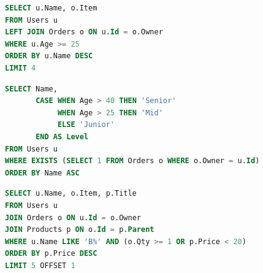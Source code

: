 \documentclass[a4paper,12pt]{article}
\begin{document}
\begin{lstlisting}[language=SQL, caption={Q3, kéttáblás LEFT JOIN szűréssel, rendezéssel és lapozással}, label={lst:llm_q3}]
SELECT u.Name, o.Item
FROM Users u
LEFT JOIN Orders o ON u.Id = o.Owner
WHERE u.Age >= 25
ORDER BY u.Name DESC
LIMIT 4
\end{lstlisting}

\begin{lstlisting}[language=SQL, caption={Q4, CASE WHEN kifejezés és korrelált EXISTS allekérdezés}, label={lst:llm_q4}]
SELECT Name,
       CASE WHEN Age > 40 THEN 'Senior'
            WHEN Age > 25 THEN 'Mid'
            ELSE 'Junior'
       END AS Level
FROM Users u
WHERE EXISTS (SELECT 1 FROM Orders o WHERE o.Owner = u.Id)
ORDER BY Name ASC
\end{lstlisting}

\begin{lstlisting}[language=SQL, caption={Q5, háromtáblás JOIN összetett feltétellel, LIKE mintával, LIMIT és OFFSET záradékkal}, label={lst:llm_q5}]
SELECT u.Name, o.Item, p.Title
FROM Users u
JOIN Orders o ON u.Id = o.Owner
JOIN Products p ON o.Id = p.Parent
WHERE u.Name LIKE 'B%' AND (o.Qty >= 1 OR p.Price < 20)
ORDER BY p.Price DESC
LIMIT 5 OFFSET 1
\end{lstlisting}
\end{document}

